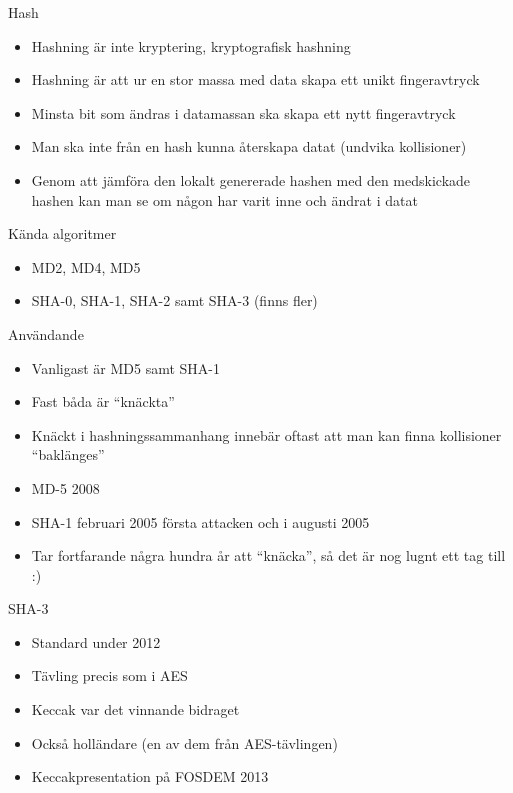 \documentclass{beamer}
\begin{document}
\begin{frame}{Hash}
\begin{itemize}
\item Hashning är inte kryptering, kryptografisk hashning
\pause \item Hashning är att ur en stor massa med data skapa ett unikt fingeravtryck
\pause \item Minsta bit som ändras i datamassan ska skapa ett nytt fingeravtryck
\pause \item Man ska inte från en hash kunna återskapa datat (undvika kollisioner)
\pause \item Genom att jämföra den lokalt genererade hashen med den medskickade
hashen kan man se om någon har varit inne och ändrat i datat
\end{itemize}
\end{frame}

\begin{frame}{Kända algoritmer}
\begin{itemize}
\item MD2, MD4, MD5
\pause \item SHA-0, SHA-1, SHA-2 samt SHA-3 (finns fler)
\end{itemize}
\end{frame}

\begin{frame}{Användande}
\begin{itemize}
\item  Vanligast är MD5 samt SHA-1
\pause \item Fast båda är ``knäckta''
\pause \item Knäckt i hashningssammanhang innebär oftast att man kan finna kollisioner
``baklänges''
\pause \item MD-5 2008
\pause \item SHA-1 februari 2005 första attacken och i augusti 2005
\pause \item Tar fortfarande några hundra år att ``knäcka'', så det är nog lugnt ett tag till :)
\end{itemize}
\end{frame}

\begin{frame}{SHA-3}
\begin{itemize}
\item Standard under 2012
\pause \item Tävling precis som i AES
\pause \item Keccak var det vinnande bidraget
\pause \item Också holländare (en av dem från AES-tävlingen)
\pause \item Keccakpresentation på FOSDEM 2013
\end{itemize}
\end{frame}
\end{document}
